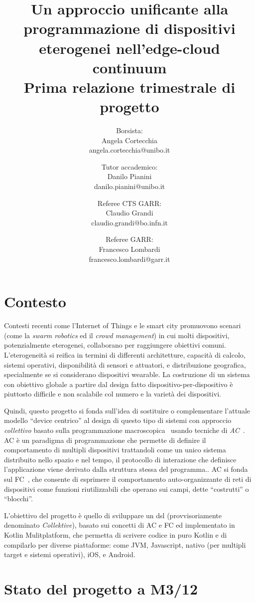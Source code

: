 \documentclass[13pt, a4paper]{article}
\title{\LARGE
    Un approccio unificante alla programmazione di dispositivi eterogenei nell'edge-cloud continuum \\ \small Prima relazione trimestrale di progetto
}
\author{
   Borsista: \\Angela Cortecchia \\ \small angela.cortecchia@unibo.it
    \and
    Tutor accademico: \\Danilo Pianini \\ \small danilo.pianini@unibo.it
    \and
    Referee CTS GARR: \\Claudio Grandi \\ \small claudio.grandi@bo.infn.it
    \and
    Referee GARR: \\Francesco Lombardi \\ \small francesco.lombardi@garr.it
}
\newcommand{\ck}{\emph{Collektive}}
\begin{document}
\maketitle
\clearpage


\section{Contesto}
\label{sec:context}

Contesti recenti come l'Internet of Things e le smart city promuovono scenari
(come la \emph{swarm robotics} ed il \emph{crowd management})
in cui molti dispositivi,
potenzialmente eterogenei, collaborano per raggiungere obiettivi comuni.
%
L'eterogeneità si reifica in termini di differenti architetture,
capacità di calcolo,
sistemi operativi,
disponibilità di sensori e attuatori,
e distribuzione geografica,
specialmente se si considerano dispositivi wearable.
%
La costruzione di un sistema con obiettivo globale a partire dal design fatto dispositivo-per-dispositivo
è piuttosto difficile e non scalabile col numero e la varietà dei dispositivi.

Quindi,
questo progetto si fonda sull'idea di sostituire o complementare l'attuale modello ``device centrico'' al design di questo tipo di sistemi
con approccio \emph{collettivo} basato sulla programmazione macroscopica~\cite{casadei22, JLAMP2019}
usando tecniche di \emph{\ac{AC}}~\cite{BealIEEEComputer2015}.
%
\ac{AC} è un paradigma di programmazione che permette di definire il comportamento di multipli dispositivi trattandoli
come un unico sistema distribuito nello spazio e nel tempo,
il protocollo di interazione che definisce l'applicazione viene derivato dalla struttura stessa del programma..
%
\ac{AC} si fonda sul \ac{FC}~\cite{TOCL2019},
che consente di esprimere il comportamento auto-organizzante di reti
di dispositivi come funzioni riutilizzabili che operano sui campi, dette ``costrutti'' o ``blocchi''.

L'obiettivo del progetto è quello di sviluppare un
\ac{dsl} (provvisoriamente denominato \ck{}),
basato sui concetti di \ac{AC} e \ac{FC} ed implementato in Kotlin Mulitplatform,
che permetta di scrivere codice in puro Kotlin e di compilarlo per diverse piattaforme:
come \ac{JVM}, Javascript, nativo (per multipli target e sistemi operativi), iOS, e Android.

\section{Stato del progetto a M3/12}\label{sec:stato-del-progetto-a-m3/12}
\end{document}
